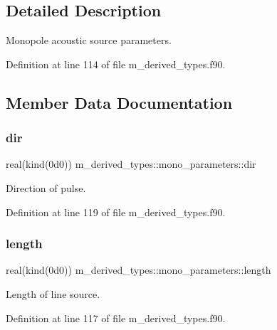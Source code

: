 \subsection{Detailed Description}
Monopole acoustic source parameters. 

Definition at line 114 of file m\+\_\+derived\+\_\+types.\+f90.



\subsection{Member Data Documentation}
\mbox{\label{structm__derived__types_1_1mono__parameters_aca4c870db228262bb65d8ce47012e8ee}} 
\subsubsection{\texorpdfstring{dir}{dir}}
{\footnotesize\ttfamily real(kind(0d0)) m\+\_\+derived\+\_\+types\+::mono\+\_\+parameters\+::dir}



Direction of pulse. 



Definition at line 119 of file m\+\_\+derived\+\_\+types.\+f90.

\mbox{\label{structm__derived__types_1_1mono__parameters_a6fb20608c56428c842df5373ae35bb94}} 
\subsubsection{\texorpdfstring{length}{length}}
{\footnotesize\ttfamily real(kind(0d0)) m\+\_\+derived\+\_\+types\+::mono\+\_\+parameters\+::length}



Length of line source. 



Definition at line 117 of file m\+\_\+derived\+\_\+types.\+f90.

